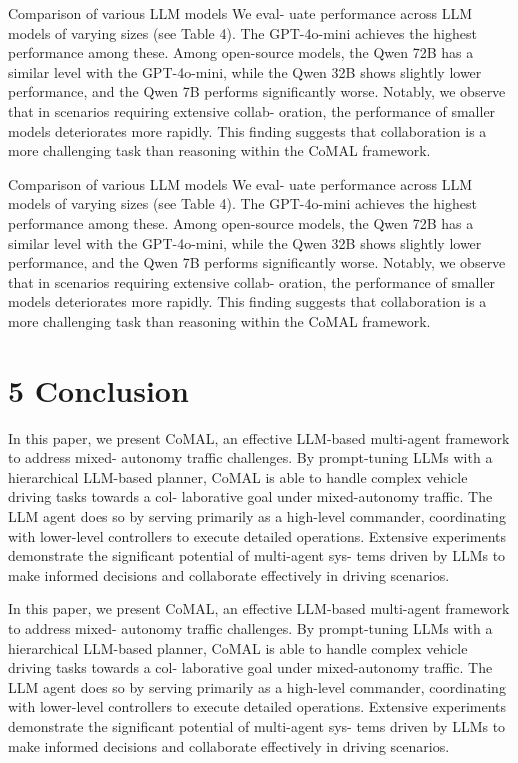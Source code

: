 \documentclass[12pt]{article}
\begin{document}
Comparison of various LLM models We eval-
uate performance across LLM models of varying sizes
(see Table 4). The GPT-4o-mini achieves the highest
performance among these. Among open-source models,
the Qwen 72B has a similar level with the GPT-4o-mini,
while the Qwen 32B shows slightly lower performance,
and the Qwen 7B performs significantly worse. Notably,
we observe that in scenarios requiring extensive collab-
oration, the performance of smaller models deteriorates
more rapidly. This finding suggests that collaboration
is a more challenging task than reasoning within the
CoMAL framework.


Comparison of various LLM models We eval-
uate performance across LLM models of varying sizes
(see Table 4). The GPT-4o-mini achieves the highest
performance among these. Among open-source models,
the Qwen 72B has a similar level with the GPT-4o-mini,
while the Qwen 32B shows slightly lower performance,
and the Qwen 7B performs significantly worse. Notably,
we observe that in scenarios requiring extensive collab-
oration, the performance of smaller models deteriorates
more rapidly. This finding suggests that collaboration
is a more challenging task than reasoning within the
CoMAL framework.


\section{5 Conclusion}


In this paper, we present CoMAL, an effective
LLM-based multi-agent framework to address mixed-
autonomy traffic challenges. By prompt-tuning LLMs
with a hierarchical LLM-based planner, CoMAL is able
to handle complex vehicle driving tasks towards a col-
laborative goal under mixed-autonomy traffic. The
LLM agent does so by serving primarily as a high-level
commander, coordinating with lower-level controllers
to execute detailed operations. Extensive experiments
demonstrate the significant potential of multi-agent sys-
tems driven by LLMs to make informed decisions and
collaborate effectively in driving scenarios.


In this paper, we present CoMAL, an effective
LLM-based multi-agent framework to address mixed-
autonomy traffic challenges. By prompt-tuning LLMs
with a hierarchical LLM-based planner, CoMAL is able
to handle complex vehicle driving tasks towards a col-
laborative goal under mixed-autonomy traffic. The
LLM agent does so by serving primarily as a high-level
commander, coordinating with lower-level controllers
to execute detailed operations. Extensive experiments
demonstrate the significant potential of multi-agent sys-
tems driven by LLMs to make informed decisions and
collaborate effectively in driving scenarios.
\end{document}
